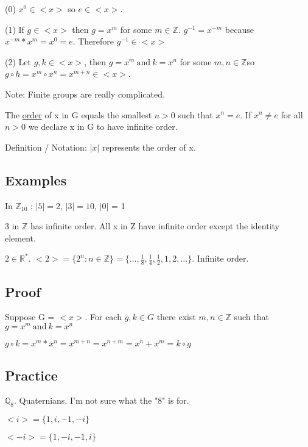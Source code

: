 \documentclass[class=scrartcl, crop=false]{standalone}
\begin{document}
(0) $x^0 \in <x>$ so $e \in <x>$.

(1) If $g \in <x>$ then $g = x^m$ for some $m \in \mathbb{Z}$. $g^{-1} = x^{-m}$ because $x^{-m} * x^{m} = x^0 = e$. Therefore $g^{-1} \in <x>$

(2) Let  $g, k \in <x>$, then $g = x^m \ \text{and} \ k = x^n$ for some $m, n \in \mathbb{Z}$so $g \circ h = x^m \circ x^n = x^{m + n} \in <x>$.

Note: Finite groups are really complicated.

The \underline{order} of x in G equals the smallest $n > 0$ such that $x^n = e$. If  $x^n \neq e$ for all $n > 0$ we declare x in G to have infinite order.

Definition / Notation: $|x|$ represents the order of x.

\subsection{Examples}

In $\mathbb{Z}_{10}$ :       $|5| = 2$, $|3| = 10$, $|0|$ = 1

3 in $\mathbb{Z}$ has infinite order. All x in Z have infinite order except the identity element.

$2 \in \mathbb{R}^*$.    $<2> = \{2^n: n \in \mathbb{Z}\} = \{\dots, \frac{1}{8}, \frac{1}{4}, \frac{1}{2}, 1, 2, \dots \}$. Infinite order.


\subsection{Proof}

Suppose G = $<x>$. For each $g, k \in G$ there exist $m, n \in \mathbb{Z}$ such that $g = x^m \ \text{and} \ k = x^n$

$g \circ k = x^m * x^n = x^{m + n} = x^{n + m} = x^n + x^m = k \circ g$

\subsection{Practice}

$\mathbb{Q}_8$. Quaternians. I'm not sure what the "8" is for.

$<i> = \{1, i, -1, -i\}$

$<-i> = \{1, -i, -1, i\}$ 
\end{document}
